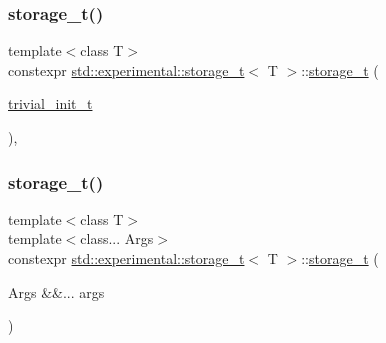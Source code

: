 \subsubsection{\texorpdfstring{storage\+\_\+t()}{storage\_t()}\hspace{0.1cm}{\footnotesize\ttfamily [1/2]}}
{\footnotesize\ttfamily template$<$class T$>$ \\
constexpr \hyperlink{unionstd_1_1experimental_1_1storage__t}{std\+::experimental\+::storage\+\_\+t}$<$ T $>$\+::\hyperlink{unionstd_1_1experimental_1_1storage__t}{storage\+\_\+t} (\begin{DoxyParamCaption}\item[{\hyperlink{structstd_1_1experimental_1_1trivial__init__t}{trivial\+\_\+init\+\_\+t}}]{ }\end{DoxyParamCaption})\hspace{0.3cm}{\ttfamily [inline]}, {\ttfamily [noexcept]}}

\mbox{\label{unionstd_1_1experimental_1_1storage__t_ae93191c4a215b166fe38fbafabd26449}} 
\subsubsection{\texorpdfstring{storage\+\_\+t()}{storage\_t()}\hspace{0.1cm}{\footnotesize\ttfamily [2/2]}}
{\footnotesize\ttfamily template$<$class T$>$ \\
template$<$class... Args$>$ \\
constexpr \hyperlink{unionstd_1_1experimental_1_1storage__t}{std\+::experimental\+::storage\+\_\+t}$<$ T $>$\+::\hyperlink{unionstd_1_1experimental_1_1storage__t}{storage\+\_\+t} (\begin{DoxyParamCaption}\item[{Args \&\&...}]{args }\end{DoxyParamCaption})\hspace{0.3cm}{\ttfamily [inline]}}

\mbox{\label{unionstd_1_1experimental_1_1storage__t_a9de04c8f12a996c2b9b55d430713b31e}} 
